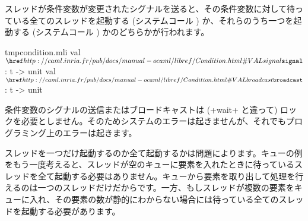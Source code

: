 スレッドが条件変数が変更されたシグナルを送ると、その条件変数に対して待っている全てのスレッドを起動する (システムコール ) か、それらのうち一つを起動する (システムコール ) かのどちらかが行われます。
%
\begin{listingcodefile}{tmpcondition.mli}
val $\libvalue{Condition}{signal}$ : t -> unit
val $\libvalue{Condition}{broadcast}$ : t -> unit
\end{listingcodefile}
%
条件変数のシグナルの送信またはブロードキャストは (\ml+wait+ と違って) ロックを必要としません。そのためシステムのエラーは起きませんが、それでもプログラミング上のエラーは起きます。

スレッドを一つだけ起動するのか全て起動するかは問題によります。キューの例をもう一度考えると、スレッドが空のキューに要素を入れたときに待っているスレッドを全て起動する必要はありません。キューから要素を取り出して処理を行えるのは一つのスレッドだけだからです。一方、もしスレッドが複数の要素をキューに入れ、その要素の数が静的にわからない場合には待っている全てのスレッドを起動する必要があります。

